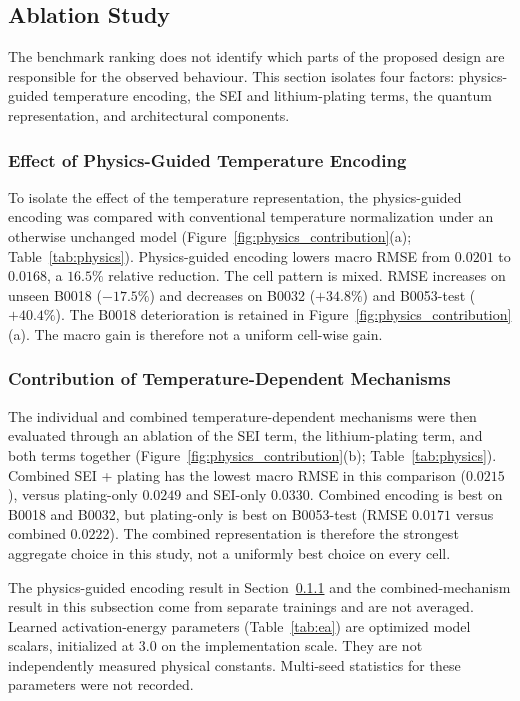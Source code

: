 \subsection{Ablation Study}
\label{sec:ablation}
\label{sec:further_study}

The benchmark ranking does not identify which parts of the proposed design are responsible for the observed behaviour. This section isolates four factors: physics-guided temperature encoding, the SEI and lithium-plating terms, the quantum representation, and architectural components.

\subsubsection{Effect of Physics-Guided Temperature Encoding}
\label{sec:physics_analysis}

To isolate the effect of the temperature representation, the physics-guided encoding was compared with conventional temperature normalization under an otherwise unchanged model (Figure~\ref{fig:physics_contribution}(a); Table~\ref{tab:physics}). Physics-guided encoding lowers macro RMSE from $0.0201$ to $0.0168$, a $16.5\%$ relative reduction. The cell pattern is mixed. RMSE increases on unseen B0018 ($-17.5\%$) and decreases on B0032 ($+34.8\%$) and B0053-test ($+40.4\%$). The B0018 deterioration is retained in Figure~\ref{fig:physics_contribution}(a). The macro gain is therefore not a uniform cell-wise gain.

\subsubsection{Contribution of Temperature-Dependent Mechanisms}
\label{sec:mechanism_analysis}

The individual and combined temperature-dependent mechanisms were then evaluated through an ablation of the SEI term, the lithium-plating term, and both terms together (Figure~\ref{fig:physics_contribution}(b); Table~\ref{tab:physics}). Combined SEI + plating has the lowest macro RMSE in this comparison ($0.0215$), versus plating-only $0.0249$ and SEI-only $0.0330$. Combined encoding is best on B0018 and B0032, but plating-only is best on B0053-test (RMSE $0.0171$ versus combined $0.0222$). The combined representation is therefore the strongest aggregate choice in this study, not a uniformly best choice on every cell.

The physics-guided encoding result in Section~\ref{sec:physics_analysis} and the combined-mechanism result in this subsection come from separate trainings and are not averaged. Learned activation-energy parameters (Table~\ref{tab:ea}) are optimized model scalars, initialized at $3.0$ on the implementation scale. They are not independently measured physical constants. Multi-seed statistics for these parameters were not recorded.

